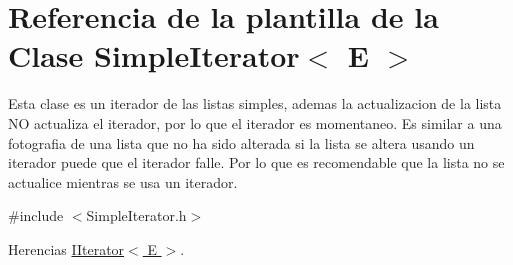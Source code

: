\hypertarget{classSimpleIterator}{\section{Referencia de la plantilla de la Clase Simple\-Iterator$<$ E $>$}
\label{classSimpleIterator}
}


Esta clase es un iterador de las listas simples, ademas la actualizacion de la lista N\-O actualiza el iterador, por lo que el iterador es momentaneo. Es similar a una fotografia de una lista que no ha sido alterada si la lista se altera usando un iterador puede que el iterador falle. Por lo que es recomendable que la lista no se actualice mientras se usa un iterador.  




{\ttfamily \#include $<$Simple\-Iterator.\-h$>$}



Herencias \hyperlink{classIIterator}{I\-Iterator$<$ E $>$}.

